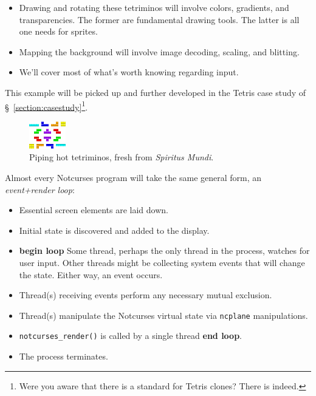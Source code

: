 \documentclass[letterpaper,10pt]{article}
\newenvironment{denseitemize}{
  \begin{itemize}
      \setlength{\itemsep}{0pt}
}{
  \end{itemize}
}
\begin{document}
\begin{denseitemize}
\item{Drawing and rotating these tetriminos will involve colors, gradients, and
      transparencies. The former are fundamental drawing tools. The latter is
      all one needs for sprites.}
\item{Mapping the background will involve image decoding, scaling, and blitting.}
\item{We'll cover most of what's worth knowing regarding input.}
\end{denseitemize}

This example will be picked up and further developed in the Tetris case study
of §~\ref{section:casestudy}\footnote{Were you aware that there is a standard
for Tetris clones? There is indeed\cite{tetris}.}.

\begin{figure}[!htbp]
\centering \includegraphics[width=.5\linewidth]{media/tetriminos.png}
\caption{Piping hot tetriminos, fresh from \textit{Spiritus Mundi}.}
\label{fig:tetriminos}
\end{figure}

Almost every Notcurses program will take the same general form, an \textit{event+render loop}:

\begin{denseitemize}
\item{Essential screen elements are laid down.}
\item{Initial state is discovered and added to the display.}
\item{\textbf{begin loop} Some thread, perhaps the only thread in the process, watches
    for user input. Other threads might be collecting system events that will
    change the state. Either way, an event occurs.}
\item{Thread(s) receiving events perform any necessary mutual exclusion.}
\item{Thread(s) manipulate the Notcurses virtual state via \texttt{ncplane} manipulations.}
\item{\texttt{notcurses\_render()} is called by a single thread \textbf{end loop}.}
\item{The process terminates.}
\end{denseitemize}
\end{document}
